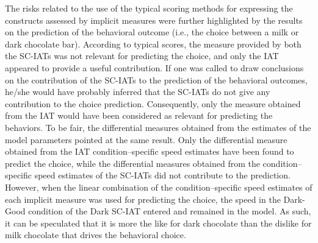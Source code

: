 \documentclass[12pt]{book}
\begin{document}
The risks related to the use of the typical scoring methods for expressing the constructs assessed by implicit measures were further highlighted by the results on the prediction of the behavioral outcome (i.e., the choice between a milk or dark chocolate bar).
According to typical scores, the measure provided by both the SC-IATs was not relevant for predicting the choice, and only the IAT appeared to provide a useful contribution. 
If one was called to draw conclusions on the contribution of the SC-IATs to the prediction of the behavioral outcomes, he/she would have probably inferred that the SC-IATs do not give any contribution to the choice prediction. 
Consequently, only the measure obtained from the IAT would have been considered as relevant for predicting the behaviors. 
To be fair, the differential measures obtained from the estimates of the model parameters pointed at the same result. 
Only the differential measure obtained from the IAT condition--specific speed estimates have been found to predict the choice, while the differential measures obtained from the condition--specific speed estimates of the SC-IATs did not contribute to the prediction. 
However, when the linear combination of the condition--specific speed estimates of each implicit measure was used for predicting the choice, the speed in the Dark-Good condition of the Dark SC-IAT entered and remained in the model. As such, it can be speculated that it is more the like for dark chocolate than the dislike for milk chocolate that drives the behavioral choice.  
\end{document}
